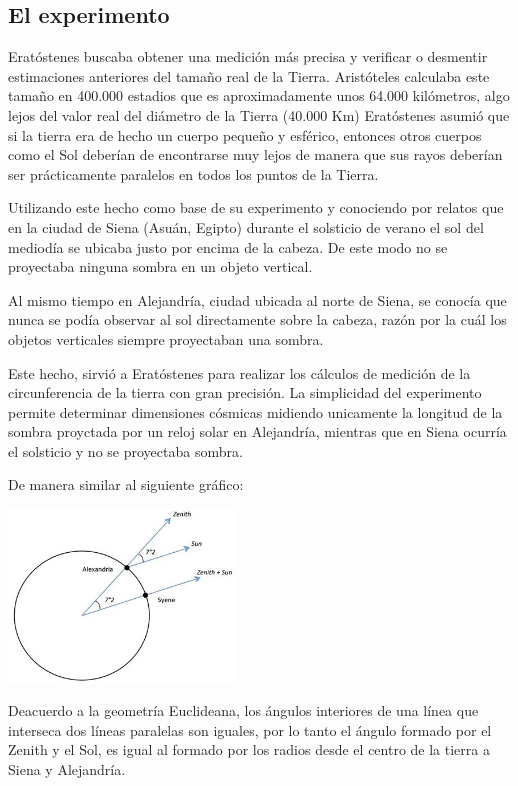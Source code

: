 \documentclass[journal]{IEEEtran}
\begin{document}
\subsection{El experimento}
Eratóstenes buscaba obtener una medición más precisa y verificar o desmentir estimaciones anteriores del tamaño real de la Tierra.
Aristóteles calculaba este tamaño en 400.000 estadios que es aproximadamente unos 64.000 kilómetros, algo lejos del valor real del diámetro de la Tierra (40.000 Km)
Eratóstenes asumió que si la tierra era de hecho un cuerpo pequeño y esférico, entonces otros cuerpos como el Sol deberían de encontrarse muy lejos  de manera que sus rayos
deberían ser prácticamente paralelos en todos los puntos de la Tierra.

Utilizando este hecho como base de su experimento y 
conociendo por relatos que en la ciudad de Siena (Asuán, Egipto)
durante el solsticio de verano el sol del mediodía se ubicaba justo por encima de la cabeza. De este modo
no se proyectaba ninguna sombra en un objeto vertical.

Al mismo tiempo en Alejandría, ciudad ubicada al norte de Siena, se conocía que nunca se podía observar al sol 
directamente sobre la cabeza, razón por la cuál los objetos verticales siempre proyectaban una sombra.

Este hecho, sirvió a Eratóstenes para realizar los cálculos de medición de la circunferencia de la tierra con gran precisión.
La simplicidad del experimento permite determinar dimensiones cósmicas midiendo unicamente la longitud de la sombra proyctada por 
un reloj solar en Alejandría, mientras que en Siena ocurría el solsticio y no se proyectaba sombra.

De manera similar al siguiente gráfico:
\begin{center}
  \includegraphics[width=60mm]{Eratostenes.jpg}
\end{center}

Deacuerdo a la geometría Euclideana, los ángulos interiores
de una línea que interseca dos líneas paralelas son iguales, por lo tanto el ángulo formado por el Zenith y el Sol, es igual al formado
por los radios desde el centro de la tierra a Siena y Alejandría.
\end{document}
